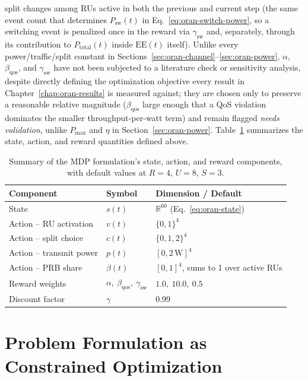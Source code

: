 split changes among RUs active in both the previous and current step
(the same event count that determines $P_{\mathrm{sw}}(t)$ in
Eq.~\ref{eq:oran-switch-power}, so a switching event is penalized once in
the reward via $\gamma_{\mathrm{sw}}$ and, separately, through its
contribution to $P_{\mathrm{total}}(t)$ inside $\mathrm{EE}(t)$ itself).
Unlike every power/traffic/split constant in Sections~\ref{sec:oran-channel}--\ref{sec:oran-power},
$\alpha$, $\beta_{\mathrm{qos}}$, and $\gamma_{\mathrm{sw}}$ have not been
subjected to a literature check or sensitivity analysis, despite directly
defining the optimization objective every result in
Chapter~\ref{chap:oran-results} is measured against; they are chosen only
to preserve a reasonable relative magnitude ($\beta_{\mathrm{qos}}$ large
enough that a QoS violation dominates the smaller throughput-per-watt
term) and remain flagged \emph{needs validation}, unlike $P_{\max}$ and
$\eta$ in Section~\ref{sec:oran-power}.
Table~\ref{tab:oran-state-action-reward} summarizes the state, action, and
reward quantities defined above.

\begin{table}[htbp]
\centering
\caption{Summary of the MDP formulation's state, action, and reward
  components, with default values at $R=4$, $U=8$, $S=3$.}
\label{tab:oran-state-action-reward}
\begin{tabular}{lll}
\toprule
Component & Symbol & Dimension / Default \\
\midrule
State & $s(t)$ & $\mathbb{R}^{60}$ (Eq.~\ref{eq:oran-state}) \\
Action -- RU activation & $v(t)$ & $\{0,1\}^4$ \\
Action -- split choice & $c(t)$ & $\{0,1,2\}^4$ \\
Action -- transmit power & $p(t)$ & $[0, 2\,\mathrm{W}]^4$ \\
Action -- PRB share & $\beta(t)$ & $[0,1]^4$, sums to 1 over active RUs \\
Reward weights & $\alpha,\ \beta_{\mathrm{qos}},\ \gamma_{\mathrm{sw}}$ & $1.0,\ 10.0,\ 0.5$ \\
Discount factor & $\gamma$ & $0.99$ \\
\bottomrule
\end{tabular}
\end{table}

\section{Problem Formulation as Constrained Optimization}
\label{sec:oran-optimization}

